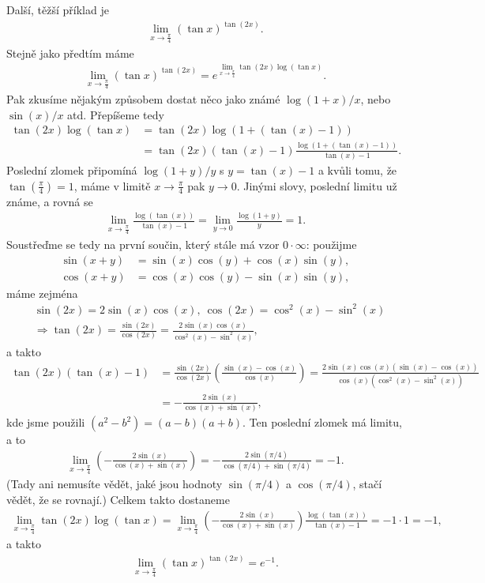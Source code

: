 \documentclass[10pt,a4paper]{article}
\begin{document}
Další, těžší příklad je
\begin{align*}
\lim_{x \to \frac{\pi}{4}} (\tan x)^{\tan(2x)}.
\end{align*}
Stejně jako předtím máme
\begin{align*}
\lim_{x \to \frac{\pi}{4}} (\tan x)^{\tan(2x)} = e^{\lim_{x \to \frac{\pi}{4}} \tan(2x) \log (\tan x)}.
\end{align*}
Pak zkusíme nějakým způsobem dostat něco jako známé $\log(1+x)/x$, nebo $\sin(x)/x$ atd. Přepíšeme tedy
\begin{align*}
\tan(2x) \log (\tan x) &= \tan(2x) \log (1 + (\tan(x) - 1)) \\
&= \tan(2x) (\tan(x)-1) \frac{\log (1 + (\tan(x) - 1))}{\tan(x) - 1}.
\end{align*}
Poslední zlomek připomíná $\log(1+y)/y$ s $y = \tan(x)-1$ a kvůli tomu, že $\tan(\frac{\pi}{4})=1$, máme v limitě $x \to \frac{\pi}{4}$ pak $y \to 0$. Jinými slovy, poslední limitu už známe, a rovná se
\begin{align*}
\lim_{x \to \frac{\pi}{4}} \frac{\log (\tan(x))}{\tan(x) - 1} = \lim_{y \to 0} \frac{\log(1+y)}{y} = 1.
\end{align*}
Soustřeďme se tedy na první součin, který stále má vzor $0 \cdot \infty$: použijme
\begin{align*}
\sin(x+y) &= \sin(x)\cos(y) + \cos(x)\sin(y), \\
\cos(x+y) &= \cos(x)\cos(y) - \sin(x)\sin(y),
\end{align*}
máme zejména
\begin{align*}
&\sin(2x) = 2 \sin(x) \cos(x), \ \cos(2x) = \cos^2(x) - \sin^2(x) \\
& \Rightarrow \tan(2x) = \frac{\sin(2x)}{\cos(2x)} = \frac{2 \sin(x) \cos(x)}{\cos^2(x) - \sin^2(x)},
\end{align*}
a takto
\begin{align*}
\tan(2x) (\tan(x)-1) &= \frac{\sin(2x)}{\cos(2x)} \left( \frac{\sin(x) - \cos(x)}{\cos(x)} \right) = \frac{2 \sin(x) \cos(x) (\sin(x) - \cos(x))}{\cos(x) (\cos^2(x) - \sin^2(x))} \\
&= - \frac{2 \sin(x) }{\cos(x) + \sin(x)},
\end{align*}
kde jsme použili $(a^2-b^2) = (a-b)(a+b)$. Ten poslední zlomek má limitu, a to
\begin{align*}
\lim_{x \to \frac{\pi}{4}} \left( - \frac{2 \sin(x) }{\cos(x) + \sin(x)} \right) = - \frac{2 \sin(\pi/4) }{\cos(\pi/4) + \sin(\pi/4)} = -1.
\end{align*}
(Tady ani nemusíte vědět, jaké jsou hodnoty $\sin(\pi/4)$ a $\cos(\pi/4)$, stačí vědět, že se rovnají.) Celkem takto dostaneme
\begin{align*}
\lim_{x \to \frac{\pi}{4}} \tan(2x) \log (\tan x) = \lim_{x \to \frac{\pi}{4}} \left( - \frac{2 \sin(x) }{\cos(x) + \sin(x)} \right) \frac{\log (\tan(x))}{\tan(x) - 1} = -1 \cdot 1 = -1,
\end{align*}
a takto
\begin{align*}
\lim_{x \to \frac{\pi}{4}} (\tan x)^{\tan(2x)} = e^{-1}.
\end{align*}
\end{document}
